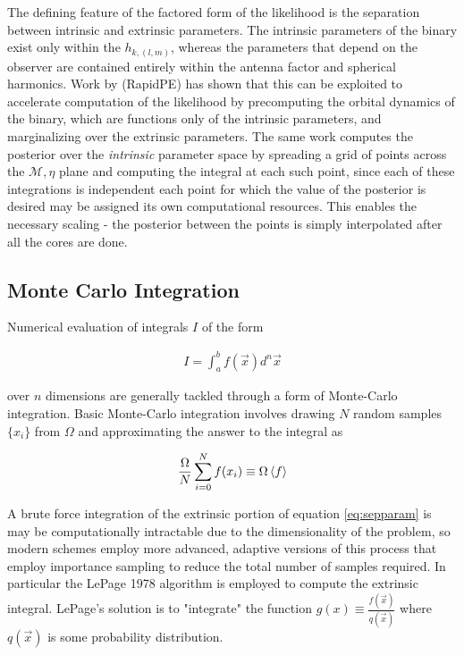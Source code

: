 The defining feature of the factored form of the likelihood is the separation between intrinsic and extrinsic parameters. The intrinsic parameters of the binary exist only within the $h_{k,(l,m)}$, whereas the parameters that depend on the observer are contained entirely within the antenna factor and spherical harmonics. Work by \cite{rapidpe} (RapidPE) has shown that this can be exploited to accelerate computation of the likelihood by precomputing the orbital dynamics of the binary, which are functions only of the intrinsic parameters, and marginalizing over the extrinsic parameters. The same work computes the posterior over the \textit{intrinsic} parameter space by spreading a grid of points across the $\mathcal{M}, \eta$ plane and computing the integral at each such point, since each of these integrations is independent each point for which the value of the posterior is desired may be assigned its own computational resources. This enables the necessary scaling - the posterior between the points is simply interpolated after all the cores are done. 

\subsection{Monte Carlo Integration}
Numerical evaluation of integrals $I$ of the form 

\begin{align}
I = \int_{a}^{b}f(\vec{x})d^n\vec{x} 
\end{align}

over $n$ dimensions are generally tackled through a form of Monte-Carlo integration. Basic Monte-Carlo integration involves drawing $N$ random samples $\{x_i\}$ from $\Omega$ and approximating the answer to the integral as 

\begin{align}
\frac{\Omega}{N}\sum_{i=0}^N f(x_i) \equiv \Omega\braket{f}
\end{align}

A brute force integration of the extrinsic portion of equation \ref{eq:sepparam} is may be computationally intractable due to the dimensionality of the problem, so modern schemes employ more advanced, adaptive versions of this process that employ importance sampling to reduce the total number of samples required. In particular the LePage 1978 algorithm \cite{montecarlo} is employed to compute the extrinsic integral. LePage's solution is to "integrate" the function $g(x) \equiv \frac{f(\vec{x})}{q(\vec{x})}$ where $q(\vec{x})$ is some probability distribution. 

